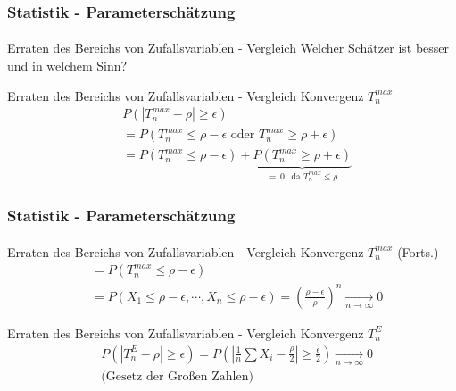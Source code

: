 \documentclass{beamer}
\begin{document}
\begin{frame}
    \frametitle{Statistik - Parameterschätzung}
\framesubtitle{}

\begin{block}{Erraten des Bereichs von Zufallsvariablen - Vergleich}
Welcher Schätzer ist besser und in welchem Sinn?
\end{block}

\begin{block}{Erraten des Bereichs von Zufallsvariablen - Vergleich Konvergenz $T_n^{max}$}
\begin{align*}
& P(| T_n^{max} - \rho | \geq \epsilon)   \\
& = P(T_n^{max} \leq \rho - \epsilon \text{ oder } T_n^{max} \geq \rho + \epsilon)   \\
& = P(T_n^{max} \leq \rho - \epsilon) + \underbrace{P(T_n^{max} \geq \rho + \epsilon)}_{= \, 0, \text{ da } T_n^{max} \leq \rho}   
\end{align*}
\end{block}

 \end{frame}


\begin{frame}
    \frametitle{Statistik - Parameterschätzung}
\framesubtitle{}

\begin{block}{Erraten des Bereichs von Zufallsvariablen - Vergleich Konvergenz $T_n^{max}$ (Forts.)}
\begin{align*}
& = P(T_n^{max} \leq \rho - \epsilon)   \\
& = P(X_1  \leq \rho - \epsilon, \cdots,  X_n \leq \rho - \epsilon )  = \left(\frac{\rho - \epsilon}{\rho}\right)^n \underset{n \to \infty}{\longrightarrow} 0
\end{align*}
\end{block}


\begin{block}{Erraten des Bereichs von Zufallsvariablen - Vergleich Konvergenz $T_n^{E}$}
\begin{align*}
& P(| T_n^{E} - \rho | \geq \epsilon)   = P(| \frac{1}{n} \sum X_i  - \frac{\rho}{2} | \geq \frac{\epsilon}{2})  \underset{n \to \infty}{\longrightarrow} 0 \\
 & \text{(Gesetz der Großen Zahlen)}
\end{align*}
\end{block}

 \end{frame}
\end{document}
